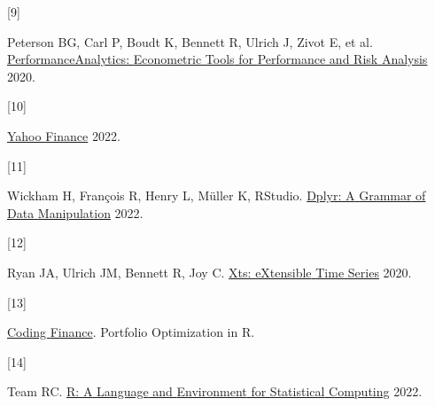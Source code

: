 \documentclass[
]{article}
\newlength{\cslhangindent}
\newlength{\csllabelwidth}
\newlength{\cslentryspacingunit} %
\newenvironment{CSLReferences}[2] %
 {%
  \setlength{\parindent}{0pt}
  \ifodd #1
  \let\oldpar\par
  \def\par{\hangindent=\cslhangindent\oldpar}
  \fi
  \setlength{\parskip}{#2\cslentryspacingunit}
 }%
 {}
\newcommand{\CSLLeftMargin}[1]{\parbox[t]{\csllabelwidth}{#1}}
\newcommand{\CSLRightInline}[1]{\parbox[t]{\linewidth - \csllabelwidth}{#1}\break}
\begin{document}
\begin{CSLReferences}{0}{0}
\leavevmode{}%
\CSLLeftMargin{{[}9{]} }%
\CSLRightInline{Peterson BG, Carl P, Boudt K, Bennett R, Ulrich J, Zivot
E, et al.
\href{https://CRAN.R-project.org/package=PerformanceAnalytics}{{PerformanceAnalytics}:
{Econometric} {Tools} for {Performance} and {Risk} {Analysis}} 2020.}

\leavevmode{}%
\CSLLeftMargin{{[}10{]} }%
\CSLRightInline{\href{https://finance.yahoo.com/}{Yahoo {Finance}}
2022.}

\leavevmode{}%
\CSLLeftMargin{{[}11{]} }%
\CSLRightInline{Wickham H, François R, Henry L, Müller K, RStudio.
\href{https://CRAN.R-project.org/package=dplyr}{Dplyr: {A} {Grammar} of
{Data} {Manipulation}} 2022.}

\leavevmode{}%
\CSLLeftMargin{{[}12{]} }%
\CSLRightInline{Ryan JA, Ulrich JM, Bennett R, Joy C.
\href{https://CRAN.R-project.org/package=xts}{Xts: {eXtensible} {Time}
{Series}} 2020.}

\leavevmode{}%
\CSLLeftMargin{{[}13{]} }%
\CSLRightInline{\href{https://www.codingfinance.com/post/2018-05-31-portfolio-opt-in-r/}{Coding
{Finance}}. Portfolio Optimization in R.}

\leavevmode{}%
\CSLLeftMargin{{[}14{]} }%
\CSLRightInline{Team RC. \href{https://www.r-project.org/}{R: {A}
{Language} and {Environment} for {Statistical} {Computing}} 2022.}

\end{CSLReferences}
\end{document}
